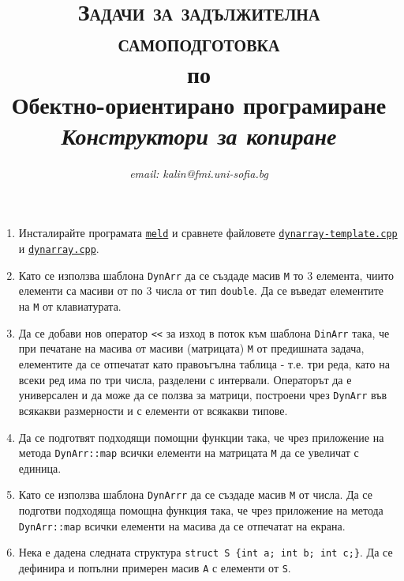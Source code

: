 \documentclass[12pt,a4paper]{article}
\author{\textit{email: kalin@fmi.uni-sofia.bg}}
\title{\textsc{Задачи за задължителна самоподготовка} \\
по \\
Обектно-ориентирано програмиране\\
\textit{Конструктори за копиране}}
\begin{document}
\maketitle


\begin{enumerate}

\item Инсталирайте програмата \href{http://meldmerge.org/}{\texttt{meld}} и сравнете файловете \href{https://github.com/stranxter/lecture-notes/blob/master/samples/02_oop/2016/03_DynArray/dynarray-template.cpp}{\texttt{dynarray-template.cpp}} и \href{https://github.com/stranxter/lecture-notes/blob/master/samples/02_oop/2016/03_DynArray/dynarray.cpp}{\texttt{dynarray.cpp}}.

\item Като се използва шаблона \texttt{DynArr} да се създаде масив \texttt{M} то 3 елемента, чиито елементи са масиви от по 3 числа от тип \texttt{double}. Да се въведат елементите на \texttt{M} от клавиатурата. 

\item Да се добави нов оператор \texttt{<<} за изход в поток към шаблона \texttt{DinArr} така, че при печатане на масива от масиви (матрицата) \texttt{M} от предишната задача, елементите да се отпечатат като правоъгълна таблица - т.е. три реда, като на всеки ред има по три числа, разделени с интервали. Операторът да е универсален и да може да се ползва за матрици, построени чрез \texttt{DynArr} във всякакви размерности и с елементи от всякакви типове.

\item Да се подготвят подходящи помощни функции така, че чрез приложение на метода \texttt{DynArr::map} всички елементи на матрицата \texttt{M} да се увеличат с единица. 

\item Като се използва шаблона \texttt{DynArrr} да се създаде масив \texttt{M} от числа. Да се подготви подходяща помощна функция така, че чрез приложение на метода \texttt{DynArr::map} всички елементи на масива да се отпечатат на екрана.

\item Нека е дадена следната структура \texttt{struct S \{int a; int b; int c;\}}. Да се дефинира и попълни примерен масив \texttt{A} с елементи от  \texttt{S}.


\end{enumerate}
\end{document}
